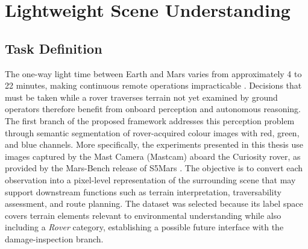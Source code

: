 \chapter{Lightweight Scene Understanding}

\section{Task Definition}

The one-way light time between Earth and Mars varies from approximately 4 to 22 minutes, making continuous remote operations impracticable \cite{nasaJPL2022Driving}. Decisions that must be taken while a rover traverses terrain not yet examined by ground operators therefore benefit from onboard perception and autonomous reasoning. The first branch of the proposed framework addresses this perception problem through semantic segmentation of rover-acquired colour images with red, green, and blue channels. More specifically, the experiments presented in this thesis use images captured by the Mast Camera (Mastcam) aboard the Curiosity rover, as provided by the Mars-Bench release of S5Mars \cite{zhang2024s5mars,purohit2025marsbench}. The objective is to convert each observation into a pixel-level representation of the surrounding scene that may support downstream functions such as terrain interpretation, traversability assessment, and route planning.
The dataset was selected because its label space covers terrain elements relevant to environmental understanding while also including a \emph{Rover} category, establishing a possible future interface with the damage-inspection branch.

